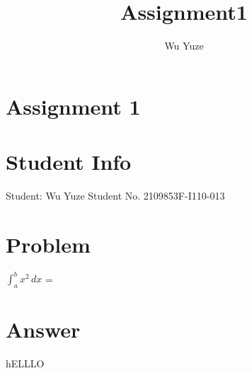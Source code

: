 \documentclass[12pt]{article}
\title{Assignment1}
\begin{document}
\section*{Assignment 1}
\author{Wu Yuze}

\section{Student Info}
Student: Wu Yuze\newline
Student No. 2109853F-I110-013

\section{Problem}

\(\int_{a}^{b} x^2 \,dx\)  =  

\section{Answer}

hELLLO 
\end{document}
